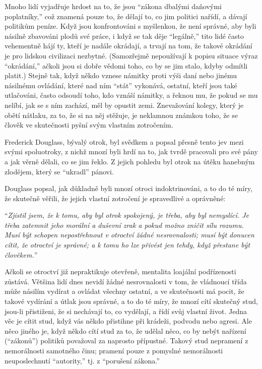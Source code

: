 \documentclass{book}
\begin{document}
Mnoho lidí vyjadřuje hrdost na to, že jsou \enquote{zákona dbalými daňovými poplatníky,} což znamená pouze to, že dělají to, co jim politici nařídí, a dávají politikům peníze. Když jsou konfrontováni s myšlenkou, že není správné, aby byli násilně zbavováni plodů své práce, i když se tak děje \enquote{legálně,} tito lidé často vehementně hájí ty, kteří je nadále okrádají, a trvají na tom, že takové okrádání je pro lidskou civilizaci nezbytné. (Samozřejmě nepoužívají k popisu situace výraz \enquote{okrádání,} ačkoli jsou si dobře vědomi toho, co by se jim stalo, kdyby odmítli platit.) Stejně tak, když někdo vznese námitky proti výši daní nebo jinému násilnému ovládání, které nad ním \enquote{stát} vykonává, ostatní, kteří jsou také utlačováni, často odsoudí toho, kdo vznáší námitky, a řeknou mu, že pokud se mu nelíbí, jak se s ním zachází, měl by opustit zemi. Znevažování kolegy, který je obětí nátlaku, za to, že si na něj stěžuje, je neklamnou známkou toho, že se člověk ve skutečnosti pyšní svým vlastním zotročením.

Frederick Douglass, bývalý otrok, byl svědkem a popsal přesně tento jev mezi svými spoluotroky, z nichž mnozí byli hrdí na to, jak tvrdě pracovali pro své pány a jak věrně dělali, co se jim řeklo. Z jejich pohledu byl otrok na útěku hanebným zlodějem, který se \enquote{ukradl} pánovi.

Douglass popsal, jak důkladně byli mnozí otroci indoktrinováni, a to do té míry, že skutečně věřili, že jejich vlastní zotročení je spravedlivé a oprávněné:

\enquote{\emph{Zjistil jsem, že k tomu, aby byl otrok spokojený, je třeba, aby byl nemyslící. Je třeba zatemnit jeho morální a duševní zrak a pokud možno zničit sílu rozumu. Musí být schopen nepostřehnout v otroctví žádné nesrovnalosti; musí být donucen cítit, že otroctví je správné; a k tomu ho lze přivést jen tehdy, když přestane být člověkem.}}

Ačkoli se otroctví již nepraktikuje otevřeně, mentalita loajální podřízenosti zůstává. Většina lidí dnes nevidí žádné nesrovnalosti v tom, že vládnoucí třída může násilím vydírat a ovládat všechny ostatní, a ve skutečnosti má pocit, že takové vydírání a útlak jsou správné, a to do té míry, že mnozí cítí skutečný stud, jsou-li přistiženi, že si nechávají to, co vydělají, a řídí svůj vlastní život. Jedna věc je cítit stud, když vás někdo přistihne při krádeži, podvodu nebo agresi. Ale něco jiného je, když někdo cítí stud za to, že udělal něco, co by nebýt nařízení (\enquote{zákonů}) politiků považoval za naprosto přípustné. Takový stud nepramení z nemorálnosti samotného činu; pramení pouze z pomyslné nemorálnosti neuposlechnutí \enquote{autority,} tj. z \enquote{porušení zákona.}
\end{document}
